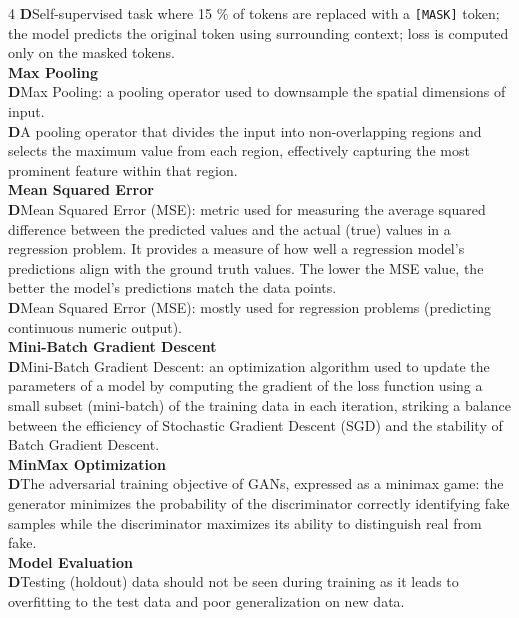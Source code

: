 \documentclass[8pt]{extarticle}
\newcommand{\dtag}{\textcolor{definitioncolor}{\tiny\textbf{D}}\;}
\begin{document}
\begin{multicols}{4}
\dtag Self-supervised task where 15 \% of tokens are replaced with a \texttt{[MASK]} token; the model predicts the original token using surrounding context; loss is computed only on the masked tokens.\\
\vspace{2pt}\textbf{Max Pooling}\\
\dtag Max Pooling: a pooling operator used to downsample the spatial dimensions of input.\\
\dtag A pooling operator that divides the input into non-overlapping regions and selects the maximum value from each region, effectively capturing the most prominent feature within that region.\\
\vspace{2pt}\textbf{Mean Squared Error}\\
\dtag Mean Squared Error (MSE): metric used for measuring the average squared difference between the predicted values and the actual (true) values in a regression problem. It provides a measure of how well a regression model's predictions align with the ground truth values. The lower the MSE value, the better the model's predictions match the data points.\\
\dtag Mean Squared Error (MSE): mostly used for regression problems (predicting continuous numeric output).\\
\vspace{2pt}\textbf{Mini-Batch Gradient Descent}\\
\dtag Mini-Batch Gradient Descent: an optimization algorithm used to update the parameters of a model by computing the gradient of the loss function using a small subset (mini-batch) of the training data in each iteration, striking a balance between the efficiency of Stochastic Gradient Descent (SGD) and the stability of Batch Gradient Descent.\\
\vspace{2pt}\textbf{MinMax Optimization}\\
\dtag The adversarial training objective of GANs, expressed as a minimax game: the generator minimizes the probability of the discriminator correctly identifying fake samples while the discriminator maximizes its ability to distinguish real from fake.\\
\vspace{2pt}\textbf{Model Evaluation}\\
\dtag Testing (holdout) data should not be seen during training as it leads to overfitting to the test data and poor generalization on new data.\\

\end{multicols}
\end{document}

